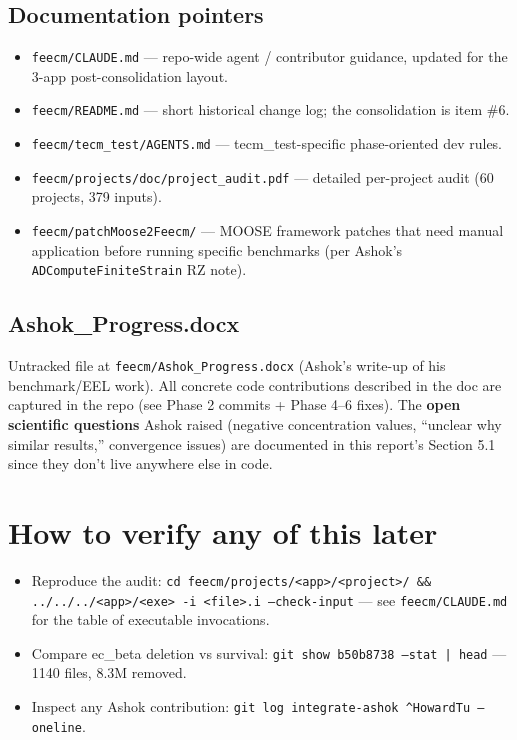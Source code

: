 \documentclass[11pt,letterpaper]{article}
\newenvironment{tightitemize}{\begin{itemize}\setlength\itemsep{0pt}\setlength\parsep{0pt}}{\end{itemize}}
\newcommand{\code}[1]{\texttt{\small #1}}
\begin{document}
\subsection{Documentation pointers}

\begin{tightitemize}
  \item \code{feecm/CLAUDE.md} --- repo-wide agent / contributor guidance, updated for the 3-app post-consolidation layout.
  \item \code{feecm/README.md} --- short historical change log; the consolidation is item \#6.
  \item \code{feecm/tecm\_test/AGENTS.md} --- tecm\_test-specific phase-oriented dev rules.
  \item \code{feecm/projects/doc/project\_audit.pdf} --- detailed per-project audit (60 projects, 379 inputs).
  \item \code{feecm/patchMoose2Feecm/} --- MOOSE framework patches that need manual application before running specific benchmarks (per Ashok's \code{ADComputeFiniteStrain} RZ note).
\end{tightitemize}

\subsection{Ashok\_Progress.docx}

Untracked file at \code{feecm/Ashok\_Progress.docx} (Ashok's write-up of his
benchmark/EEL work). All concrete code contributions described in the doc are
captured in the repo (see Phase 2 commits + Phase 4--6 fixes). The
\textbf{open scientific questions} Ashok raised (negative concentration values,
``unclear why similar results,'' convergence issues) are documented in this
report's Section 5.1 since they don't live anywhere else in code.

\section{How to verify any of this later}

\begin{tightitemize}
  \item Reproduce the audit: \code{cd feecm/projects/<app>/<project>/ \&\& ../../../<app>/<exe> -i <file>.i --check-input}
    --- see \code{feecm/CLAUDE.md} for the table of executable invocations.
  \item Compare ec\_beta deletion vs survival: \code{git show b50b8738 --stat | head} --- 1140 files, 8.3M removed.
  \item Inspect any Ashok contribution: \code{git log integrate-ashok \textasciicircum{}HowardTu --oneline}.
\end{tightitemize}
\end{document}
